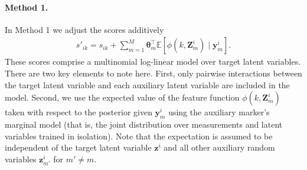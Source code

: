 \documentclass[12pt]{article}
\newcommand{\T}{\top}
\newcommand{\E}{\mathbb{E}}
\newcommand{\given}{\mid}
\begin{document}
\paragraph{Method 1.}
In Method 1 we adjust the scores additively
\begin{align}
\label{eq:method-1-scores}
s'_{ik} = s_{ik} + \sum_{m=1}^M \bm{\theta}_m^\T \E[ \phi(k, \bm{Z}^i_m) \given \bm{y}^i_m ].
\end{align}
These scores comprise a multinomial log-linear model over target latent variables. There are two key elements to note here. First, only pairwise interactions between the target latent variable and each auxiliary latent variable are included in the model. Second, we use the expected value of the feature function $\phi(k, \bm{Z}^i_m)$ taken with respect to the posterior given $\bm{y}^i_m$ using the auxiliary marker's marginal model (that is, the joint distribution over measurements and latent variables trained in isolation). Note that the expectation is assumed to be independent of the target latent variable $\bm{z}^i$ and all other auxiliary random variables $\bm{z}^i_{m'}$ for $m' \neq m$.
\end{document}
